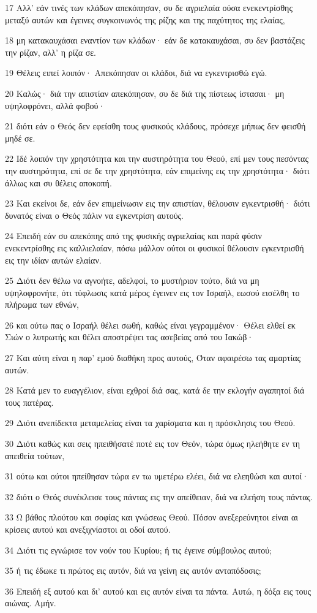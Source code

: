 \par 17 Αλλ' εάν τινές των κλάδων απεκόπησαν, συ δε αγριελαία ούσα ενεκεντρίσθης μεταξύ αυτών και έγεινες συγκοινωνός της ρίζης και της παχύτητος της ελαίας,
\par 18 μη κατακαυχάσαι εναντίον των κλάδων· εάν δε κατακαυχάσαι, συ δεν βαστάζεις την ρίζαν, αλλ' η ρίζα σε.
\par 19 Θέλεις ειπεί λοιπόν· Απεκόπησαν οι κλάδοι, διά να εγκεντρισθώ εγώ.
\par 20 Καλώς· διά την απιστίαν απεκόπησαν, συ δε διά της πίστεως ίστασαι· μη υψηλοφρόνει, αλλά φοβού·
\par 21 διότι εάν ο Θεός δεν εφείσθη τους φυσικούς κλάδους, πρόσεχε μήπως δεν φεισθή μηδέ σε.
\par 22 Ιδέ λοιπόν την χρηστότητα και την αυστηρότητα του Θεού, επί μεν τους πεσόντας την αυστηρότητα, επί σε δε την χρηστότητα, εάν επιμείνης εις την χρηστότητα· διότι άλλως και συ θέλεις αποκοπή.
\par 23 Και εκείνοι δε, εάν δεν επιμείνωσιν εις την απιστίαν, θέλουσιν εγκεντρισθή· διότι δυνατός είναι ο Θεός πάλιν να εγκεντρίση αυτούς.
\par 24 Επειδή εάν συ απεκόπης από της φυσικής αγριελαίας και παρά φύσιν ενεκεντρίσθης εις καλλιελαίαν, πόσω μάλλον ούτοι οι φυσικοί θέλουσιν εγκεντρισθή εις την ιδίαν αυτών ελαίαν.
\par 25 Διότι δεν θέλω να αγνοήτε, αδελφοί, το μυστήριον τούτο, διά να μη υψηλοφρονήτε, ότι τύφλωσις κατά μέρος έγεινεν εις τον Ισραήλ, εωσού εισέλθη το πλήρωμα των εθνών,
\par 26 και ούτω πας ο Ισραήλ θέλει σωθή, καθώς είναι γεγραμμένον· Θέλει ελθεί εκ Σιών ο λυτρωτής και θέλει αποστρέψει τας ασεβείας από του Ιακώβ·
\par 27 Και αύτη είναι η παρ' εμού διαθήκη προς αυτούς, Όταν αφαιρέσω τας αμαρτίας αυτών.
\par 28 Κατά μεν το ευαγγέλιον, είναι εχθροί διά σας, κατά δε την εκλογήν αγαπητοί διά τους πατέρας.
\par 29 Διότι ανεπίδεκτα μεταμελείας είναι τα χαρίσματα και η πρόσκλησις του Θεού.
\par 30 Διότι καθώς και σεις ηπειθήσατέ ποτέ εις τον Θεόν, τώρα όμως ηλεήθητε εν τη απειθεία τούτων,
\par 31 ούτω και ούτοι ηπείθησαν τώρα εν τω υμετέρω ελέει, διά να ελεηθώσι και αυτοί·
\par 32 διότι ο Θεός συνέκλεισε τους πάντας εις την απείθειαν, διά να ελεήση τους πάντας.
\par 33 Ω βάθος πλούτου και σοφίας και γνώσεως Θεού. Πόσον ανεξερεύνητοι είναι αι κρίσεις αυτού και ανεξιχνίαστοι αι οδοί αυτού.
\par 34 Διότι τις εγνώρισε τον νούν του Κυρίου; ή τις έγεινε σύμβουλος αυτού;
\par 35 ή τις έδωκε τι πρώτος εις αυτόν, διά να γείνη εις αυτόν ανταπόδοσις;
\par 36 Επειδή εξ αυτού και δι' αυτού και εις αυτόν είναι τα πάντα. Αυτώ, η δόξα εις τους αιώνας. Αμήν.

